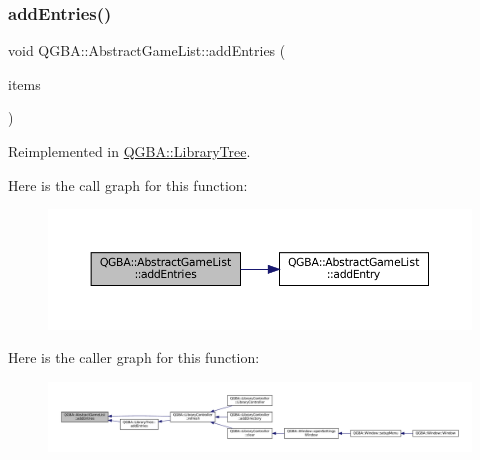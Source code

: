 \subsubsection{\texorpdfstring{add\+Entries()}{addEntries()}}
{\footnotesize\ttfamily void Q\+G\+B\+A\+::\+Abstract\+Game\+List\+::add\+Entries (\begin{DoxyParamCaption}\item[{Q\+List$<$ \mbox{\hyperlink{namespace_q_g_b_a_a201fa9f2cb8f778666a134ba81909358}{Library\+Entry\+Ref}} $>$}]{items }\end{DoxyParamCaption})\hspace{0.3cm}{\ttfamily [virtual]}}



Reimplemented in \mbox{\hyperlink{class_q_g_b_a_1_1_library_tree_ad824322266cad285b9195ca1314b67b1}{Q\+G\+B\+A\+::\+Library\+Tree}}.

Here is the call graph for this function\+:
\nopagebreak
\begin{figure}[H]
\begin{center}
\leavevmode
\includegraphics[width=350pt]{class_q_g_b_a_1_1_abstract_game_list_a497a70573ba98309c74526c67d282ec3_cgraph}
\end{center}
\end{figure}
Here is the caller graph for this function\+:
\nopagebreak
\begin{figure}[H]
\begin{center}
\leavevmode
\includegraphics[width=350pt]{class_q_g_b_a_1_1_abstract_game_list_a497a70573ba98309c74526c67d282ec3_icgraph}
\end{center}
\end{figure}
\mbox{\label{class_q_g_b_a_1_1_abstract_game_list_a4eb177df105d205ebc19a017343874ce}} 
